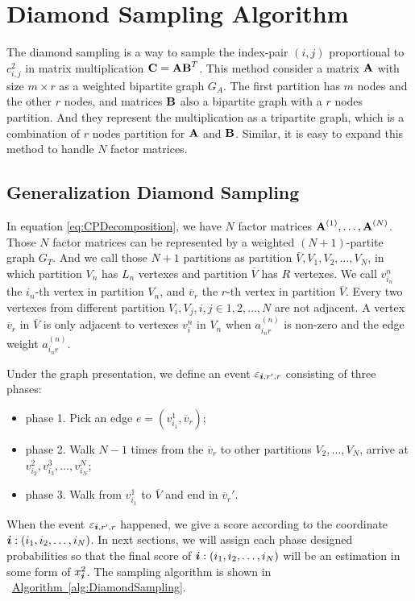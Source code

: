 \documentclass[letterpaper]{article}
\newcommand{\Sca}[3]{{#1}^{(#2)}_{i_#2#3}}%
\newcommand{\V}[1]{{\bm{{\MakeLowercase{#1}}}}}
\newcommand{\M}[1]{{\bm{\mathbf{\MakeUppercase{#1}}}}}
\newcommand{\Mn}[2]{\M{#1}^{(#2)}}
\newcommand{\Alg}[1] {\hyperref[alg:#1] {Algorithm~\ref*{alg:#1}}}
\newcommand{\Coord}{(i_1,i_2,\ldots,i_N)}
\begin{document}
\section{Diamond Sampling Algorithm}

The diamond sampling is a way to sample the index-pair $(i,j)$ proportional to $c^2_{i,j}$ in matrix multiplication $\M{C} = \M{A}\M{B}^T$.
This method consider a matrix $\M{A}$ with size $m\times r$ as a weighted bipartite graph $G_{A}$.
The first partition has $m$ nodes and the other $r$ nodes, and matrices $\M{B}$ also a bipartite graph with a $r$ nodes partition. And they represent the multiplication as a tripartite graph,
which is a combination of $r$ nodes partition for $\M{A}$ and $\M{B}$. Similar, it is easy to  expand this method to handle $N$ factor matrices.

\subsection{Generalization Diamond Sampling}

In equation \ref{eq:CPDecomposition}, we have $N$ factor matrices $\Mn{A}{1},\dots,\Mn{A}{N}$.
Those $N$ factor matrices can be represented by a weighted $(N+1)$-partite graph $G_{T}$.
And we call those $N+1$ partitions as partition $\overline{V},V_{1},V_{2},\ldots,V_{N}$,
in which partition $V_{n}$ has $L_n$ vertexes and partition $\overline{V}$ has $R$ vertexes.
We call $v^n_{i_n}$ the $i_n$-th vertex in partition $V_{n}$,
and $\overline{v}_{r}$ the $r$-th vertex in partition $\overline{V}$.
Every two vertexes from different partition $V_i,V_j,i,j\in {1,2,\ldots,N}$ are not adjacent.
A vertex $\overline{v}_r$ in $\overline{V}$ is only adjacent to vertexes $v^n_i$ in $V_n$ when $\Sca{a}{n}{r}$ is non-zero and the edge weight $\Sca{a}{n}{r}$.

Under the graph presentation, we define an event $\varepsilon_{\V{i},r',r}$ consisting of three phases:
\begin{itemize}
  \item phase 1. Pick an edge $e=(v^1_{i_1},\overline{v}_r)$;
  \item phase 2. Walk $N-1$ times from the $\overline{v}_r$ to other partitions $V_2,\ldots,V_N$, arrive at $v^2_{i_2},v^3_{i_3},\ldots,v^N_{i_N}$;
  \item phase 3. Walk from $v^1_{i_1}$ to $\overline{V}$ and end in $\overline{v}_r'$.
\end{itemize}

When the event $\varepsilon_{\V{i},r',r}$ happened,
we give a score according to the coordinate $\V{i}:\Coord$.
In next sections, we will assign each phase designed probabilities so that the final score of $\V{i}:\Coord$ will be an estimation in some form of $x^2_{\V{i}}$.
The sampling algorithm is shown in ~\Alg{DiamondSampling}.
\end{document}
